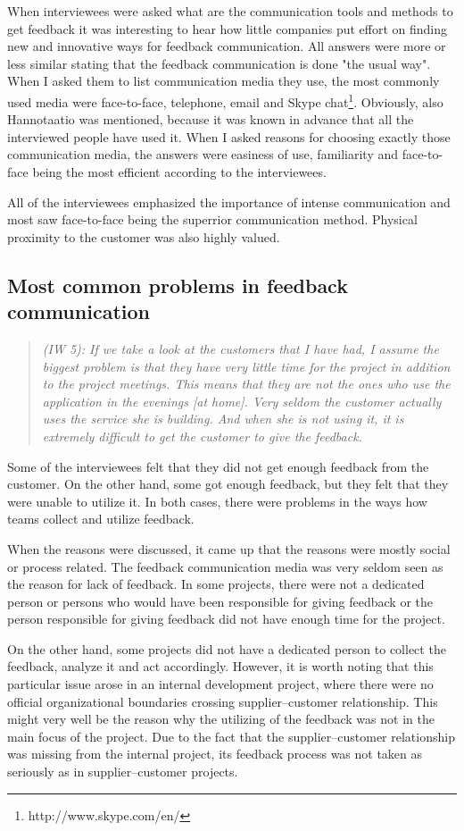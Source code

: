 \documentclass[english,12pt,a4paper,pdftex]{article}
\newcommand{\q}[2]{
\begin{quote}
\emph{(IW #1): #2}
\end{quote}}
\begin{document}
When interviewees were asked what are the communication tools and methods to get feedback it was interesting to hear how little companies put effort on finding new and innovative ways for feedback communication. All answers were more or less similar stating that the feedback communication is done "the usual way". When I asked them to list communication media they use, the most commonly used media were face-to-face, telephone, email and Skype chat\footnote{http://www.skype.com/en/}. Obviously, also Hannotaatio was mentioned, because it was known in advance that all the interviewed people have used it. When I asked reasons for choosing exactly those communication media, the answers were easiness of use, familiarity and face-to-face being the most efficient according to the interviewees. 

All of the interviewees emphasized the importance of intense communication and most saw face-to-face being the superrior communication method. Physical proximity to the customer was also highly valued.

\subsection{Most common problems in feedback communication}

\q{5}{If we take a look at the customers that I have had, I assume the biggest problem is that they have very little time for the project in addition to the project meetings. This means that they are not the ones who use the application in the evenings [at home]. Very seldom the customer actually uses the service she is building. And when she is not using it, it is extremely difficult to get the customer to give the feedback.}

Some of the interviewees felt that they did not get enough feedback from the customer. On the other hand, some got enough feedback, but they felt that they were unable to utilize it. In both cases, there were problems in the ways how teams collect and utilize feedback.

When the reasons were discussed, it came up that the reasons were mostly social or process related. The feedback communication media was very seldom seen as the reason for lack of feedback. In some projects, there were not a dedicated person or persons who would have been responsible for giving feedback or the person responsible for giving feedback did not have enough time for the project. 

On the other hand, some projects did not have a dedicated person to collect the feedback, analyze it and act accordingly. However, it is worth noting that this particular issue arose in an internal development project, where there were no official organizational boundaries crossing supplier--customer relationship. This might very well be the reason why the utilizing of the feedback was not in the main focus of the project. Due to the fact that the supplier--customer relationship was missing from the internal project, its feedback process was not taken as seriously as in supplier--customer projects.
\end{document}
